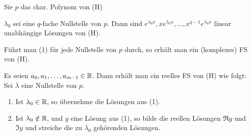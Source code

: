 \documentclass[a4paper,twoside,DIV15,BCOR12mm]{scrbook}
\begin{document}
\begin{satz} %
Sie $p$ das char. Polynom von (H) \\
\begin{liste}
\item $\lambda_0$ sei eine $q$-fache Nullstelle von $p$. Dann sind $e^{\lambda_0x}, xe^{\lambda_0x}, \ldots, x^{q-1}e^{\lambda_0x}$ linear unabhängige Lösungen von (H).
\item Führt man (1) für jede Nullstelle von $p$ durch, so erhält man ein (komplexes) FS von (H).
\item Es seien $a_0, a_1, \ldots, a_{m-1} \in \mathbb{R}$. Dann erhält man ein reelles FS von (H) wie folgt: \\
Sei $\lambda$ eine Nullstelle von $p$.
\begin{enumerate}
\item Ist $\lambda_0 \in \mathbb{R}$, so übernehme die Lösungen aus (1).
\item Ist $\lambda_0 \notin \mathbb{R}$, und $y$ eine Lösung aus (1), so bilde die reellen Lösungen $\Re y$ und $\Im y$ und streiche die zu $\overline{\lambda_0}$ gehörenden Lösungen.
\end{enumerate}
\end{liste}
\end{satz}
\end{document}
